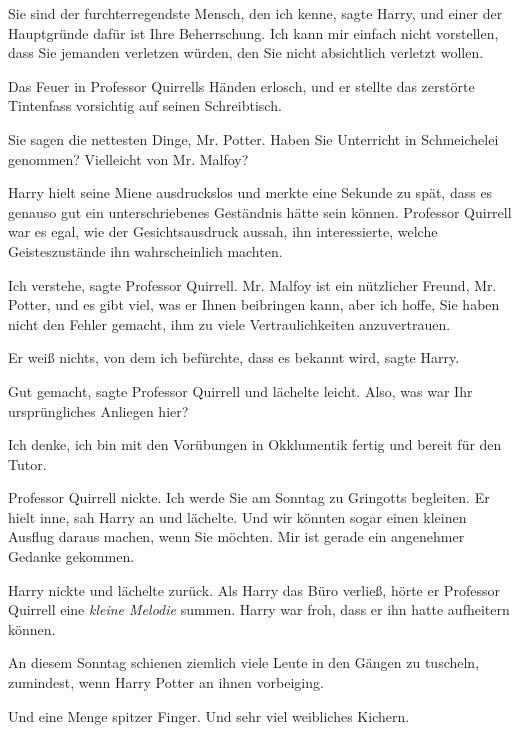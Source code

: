 \glqq Sie sind der furchterregendste Mensch, den ich kenne\grqq{}, sagte Harry,
\glqq und einer der Hauptgründe dafür ist Ihre Beherrschung. Ich kann mir
einfach nicht vorstellen, dass Sie jemanden verletzen würden, den Sie nicht
absichtlich verletzt wollen.\grqq{}

Das Feuer in Professor Quirrells Händen erlosch, und er stellte das zerstörte
Tintenfass vorsichtig auf seinen Schreibtisch.

\glqq Sie sagen die nettesten Dinge, Mr. Potter. Haben Sie Unterricht in
Schmeichelei genommen? Vielleicht von Mr. Malfoy?\grqq{}

Harry hielt seine Miene ausdruckslos und merkte eine Sekunde zu spät, dass es
genauso gut ein unterschriebenes Geständnis hätte sein können. Professor
Quirrell war es egal, wie der Gesichtsausdruck aussah, ihn interessierte, welche
Geisteszustände ihn wahrscheinlich machten.

\glqq Ich verstehe\grqq{}, sagte Professor Quirrell. \glqq Mr. Malfoy ist ein
nützlicher Freund, Mr. Potter, und es gibt viel, was er Ihnen beibringen kann,
aber ich hoffe, Sie haben nicht den Fehler gemacht, ihm zu viele
Vertraulichkeiten anzuvertrauen.\grqq{}

\glqq Er weiß nichts, von dem ich befürchte, dass es bekannt wird\grqq{}, sagte
Harry.

\glqq Gut gemacht\grqq{}, sagte Professor Quirrell und lächelte leicht. \glqq
Also, was war Ihr ursprüngliches Anliegen hier?\grqq{}

\glqq Ich denke, ich bin mit den Vorübungen in Okklumentik fertig und bereit für
den Tutor.\grqq{}

Professor Quirrell nickte. \glqq Ich werde Sie am Sonntag zu Gringotts
begleiten.\grqq{} Er hielt inne, sah Harry an und lächelte. \glqq Und wir
könnten sogar einen kleinen Ausflug daraus machen, wenn Sie möchten. Mir ist
gerade ein angenehmer Gedanke gekommen.\grqq{}

Harry nickte und lächelte zurück. Als Harry das Büro verließ, hörte er Professor
Quirrell eine \emph{kleine Melodie} summen. Harry war froh, dass er ihn hatte
aufheitern können.

An diesem Sonntag schienen ziemlich viele Leute in den Gängen zu tuscheln,
zumindest, wenn Harry Potter an ihnen vorbeiging.

Und eine Menge spitzer Finger. Und sehr viel weibliches Kichern.

